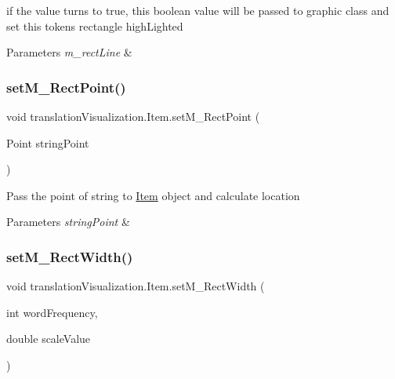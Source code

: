 if the value turns to true, this boolean value will be passed to graphic class and set this token\textquotesingle{}s rectangle high\+Lighted 
\begin{DoxyParams}{Parameters}
{\em m\+\_\+rect\+Line} & \\
\hline
\end{DoxyParams}
\mbox{\label{classtranslation_visualization_1_1_item_a7f3800ca0e6278cfb693b559c96eaedf}} 
\subsubsection{\texorpdfstring{set\+M\+\_\+\+Rect\+Point()}{setM\_RectPoint()}}
{\footnotesize\ttfamily void translation\+Visualization.\+Item.\+set\+M\+\_\+\+Rect\+Point (\begin{DoxyParamCaption}\item[{Point}]{string\+Point }\end{DoxyParamCaption})\hspace{0.3cm}{\ttfamily [inline]}}

Pass the point of string to \hyperlink{classtranslation_visualization_1_1_item}{Item} object and calculate location 
\begin{DoxyParams}{Parameters}
{\em string\+Point} & \\
\hline
\end{DoxyParams}
\mbox{\label{classtranslation_visualization_1_1_item_a4fee3de03fa3b1e219cd5c4c8d0ebc95}} 
\subsubsection{\texorpdfstring{set\+M\+\_\+\+Rect\+Width()}{setM\_RectWidth()}}
{\footnotesize\ttfamily void translation\+Visualization.\+Item.\+set\+M\+\_\+\+Rect\+Width (\begin{DoxyParamCaption}\item[{int}]{word\+Frequency,  }\item[{double}]{scale\+Value }\end{DoxyParamCaption})\hspace{0.3cm}{\ttfamily [inline]}}

